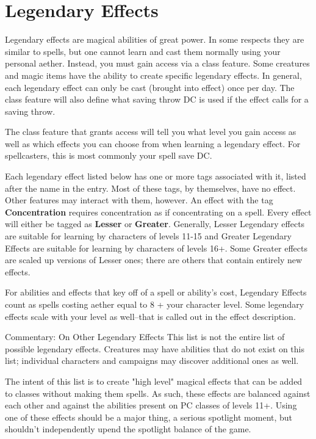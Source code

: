 \section{Legendary Effects}
Legendary effects are magical abilities of great power. In some respects they are similar to spells, but one cannot learn and cast them normally using your personal aether. Instead, you must gain access via a class feature. Some creatures and magic items have the ability to create specific legendary effects. In general, each legendary effect can only be cast (brought into effect) once per day. The class feature will also define what saving throw DC is used if the effect calls for a saving throw.

The class feature that grants access will tell you what level you gain access as well as which effects you can choose from when learning a legendary effect.  For spellcasters, this is most commonly your spell save DC.

Each legendary effect listed below has one or more tags associated with it, listed after the name in the entry. Most of these tags, by themselves, have no effect. Other features may interact with them, however. An effect with the tag \textbf{Concentration} requires concentration as if concentrating on a spell. Every effect will either be tagged as \textbf{Lesser} or \textbf{Greater}. Generally, Lesser Legendary effects are suitable for learning by characters of levels 11-15 and Greater Legendary Effects are suitable for learning by characters of levels 16+. Some Greater effects are scaled up versions of Lesser ones; there are others that contain entirely new effects.

For abilities and effects that key off of a spell or ability's cost, Legendary Effects count as spells costing aether equal to 8 + your character level. Some legendary effects scale with your level as well--that is called out in the effect description.

\begin{DndComment}{Commentary: On Other Legendary Effects}
	This list is not the entire list of possible legendary effects. Creatures may have abilities that do not exist on this list; individual characters and campaigns may discover additional ones as well.

	The intent of this list is to create "high level" magical effects that can be added to classes without making them spells. As such, these effects are balanced against each other and against the abilities present on PC classes of levels 11+. Using one of these effects should be a major thing, a serious spotlight moment, but shouldn't independently upend the spotlight balance of the game.
\end{DndComment}

